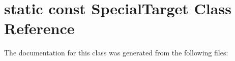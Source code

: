 \hypertarget{classstatic_01const_01SpecialTarget}{}\section{static const Special\+Target Class Reference}
\label{classstatic_01const_01SpecialTarget}


The documentation for this class was generated from the following files\+: